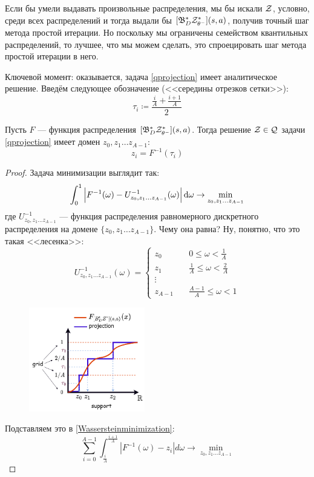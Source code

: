 Если бы умели выдавать произвольные распределения, мы бы искали $\mathcal{Z}$, условно, среди всех распределений и тогда выдали бы $[\mathfrak{B}^*_D \mathcal{Z}^*_{\theta^-}](s, a)$, получив точный шаг метода простой итерации. Но поскольку мы ограничены семейством квантильных распределений, то лучшее, что мы можем сделать, это спроецировать шаг метода простой итерации в него. 

Ключевой момент: оказывается, задача \eqref{qprojection} имеет аналитическое решение. Введём следующее обозначение (<<середины отрезков сетки>>):
$$\tau_i \coloneqq \frac{\frac{i}{A} + \frac{i + 1}{A}}{2}$$

\begin{theorem}
Пусть $F$ --- функция распределения $[\mathfrak{B}^*_D \mathcal{Z}^*_{\theta^-}](s, a)$. Тогда решение $\mathcal{Z} \in \mathcal{Q}$ задачи \eqref{qprojection} имеет домен $z_0, z_1 \dots z_{A-1}$:
$$z_i = F^{-1}(\tau_i)$$
\begin{proof}
Задача минимизации выглядит так:
\begin{equation}\label{Wassersteinminimization}
\int_0^1 \left| F^{-1}(\omega) - U^{-1}_{z_0, z_1 \dots z_{A-1}}(\omega) \right| \mathop{}\!\mathrm{d} \omega \to \min_{z_0, z_1 \dots z_{A-1}}
\end{equation}
где $ U^{-1}_{z_0, z_1 \dots z_{A-1}}$ --- функция распределения равномерного дискретного распределения на домене $\{z_0, z_1 \dots z_{A-1}\}$. Чему она равна? Ну, понятно, что это такая <<лесенка>>:
$$U^{-1}_{z_0, z_1 \dots z_{A-1}}(\omega) = \begin{cases}
z_0 \quad &0 \le \omega < \frac{1}{A} \\
z_1 \quad &\frac{1}{A} \le \omega < \frac{2}{A} \\
\vdots \\
z_{A - 1} \quad &\frac{A - 1}{A} \le \omega < 1
\end{cases}$$

\begin{figure}
\vspace{-0.5cm}
\centering
\includegraphics[width=0.45\textwidth]{Images/quantileprojection.png}
\vspace{-0.75cm}
\end{figure}
Подставляем это в \eqref{Wassersteinminimization}:
\begin{equation*}
\sum_{i = 0}^{A - 1} \int_{\frac{i}{A}}^{\frac{i + 1}{A}} \left| F^{-1}(\omega) - z_i \right| d\omega \to \min_{z_0, z_1 \dots z_{A-1}}
\end{equation*}


\end{proof}
\end{theorem}
